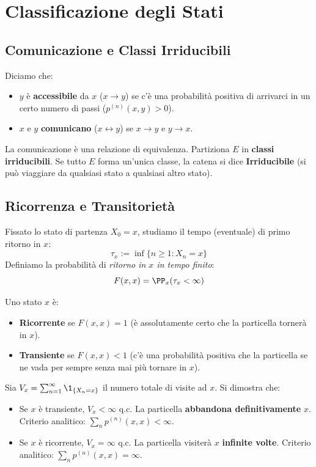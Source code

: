 \section{Classificazione degli Stati}

\subsection{Comunicazione e Classi Irriducibili}
Diciamo che:
\begin{itemize}
    \item $y$ è \textbf{accessibile} da $x$ ($x \to y$) se c'è una probabilità positiva di arrivarci in un certo numero di passi ($p^{(n)}(x,y) > 0$).
    \item $x$ e $y$ \textbf{comunicano} ($x \leftrightarrow y$) se $x \to y$ e $y \to x$.
\end{itemize}
La comunicazione è una relazione di equivalenza. Partiziona $E$ in \textbf{classi irriducibili}. Se tutto $E$ forma un'unica classe, la catena si dice \textbf{Irriducibile} (si può viaggiare da qualsiasi stato a qualsiasi altro stato).

\subsection{Ricorrenza e Transitorietà}
Fissato lo stato di partenza $X_0 = x$, studiamo il tempo (eventuale) di primo ritorno in $x$:
\[ \tau_x := \inf\{n \ge 1 : X_n = x\} \]
Definiamo la probabilità di \emph{ritorno in $x$ in tempo finito}:
\[ F(x, x) = \PP_x(\tau_x < \infty) \]

\begin{definition}
Uno stato $x$ è:
\begin{itemize}
    \item \textbf{Ricorrente} se $F(x, x) = 1$ (è assolutamente certo che la particella tornerà in $x$).
    \item \textbf{Transiente} se $F(x, x) < 1$ (c'è una probabilità positiva che la particella se ne vada per sempre senza mai più tornare in $x$).
\end{itemize}
\end{definition}

Sia $V_x = \sum_{n=1}^\infty \1_{\{X_n = x\}}$ il numero totale di visite ad $x$. Si dimostra che:
\begin{itemize}
    \item Se $x$ è transiente, $V_x < \infty$ q.c. La particella \textbf{abbandona definitivamente} $x$. Criterio analitico: $\sum_n p^{(n)}(x,x) < \infty$.
    \item Se $x$ è ricorrente, $V_x = \infty$ q.c. La particella visiterà $x$ \textbf{infinite volte}. Criterio analitico: $\sum_n p^{(n)}(x,x) = \infty$.
\end{itemize}

